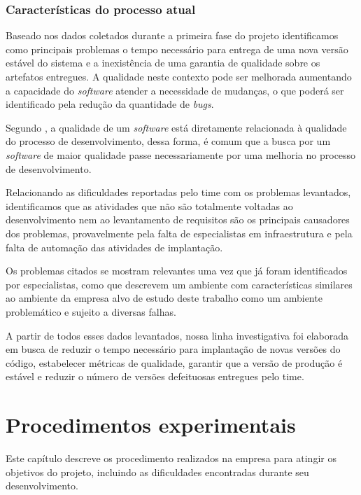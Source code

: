 \documentclass[
12pt,				%
openright,			%
oneside,			%
a4paper,			%
english,			%
french,				%
spanish,			%
brazil,				%
]{abntex2}
\begin{document}
\subsection{Características do processo atual} 

Baseado nos dados coletados durante a primeira fase do projeto identificamos como principais problemas o tempo necessário para entrega de uma nova versão estável do sistema e a inexistência de uma garantia de qualidade sobre os artefatos entregues. A qualidade neste contexto pode ser melhorada aumentando a capacidade do \textit{software} atender a necessidade de mudanças, o que poderá ser identificado pela redução da quantidade de \textit{bugs}.

Segundo , a qualidade de um \textit{software} está diretamente relacionada à qualidade do processo de desenvolvimento, dessa forma, é comum que a busca por um \textit{software} de maior qualidade passe necessariamente por uma melhoria no processo de desenvolvimento.

Relacionando as dificuldades reportadas pelo time com os problemas levantados, identificamos que as atividades que não são totalmente voltadas ao desenvolvimento nem ao levantamento de requisitos são os principais causadores dos problemas, provavelmente pela falta de especialistas em infraestrutura e pela falta de automação das atividades de implantação.

Os problemas citados se mostram relevantes uma vez que já foram identificados por especialistas, como  que descrevem um ambiente com características similares ao ambiente da empresa alvo de estudo deste trabalho como um ambiente problemático e sujeito a diversas falhas.

A partir de todos esses dados levantados, nossa linha investigativa foi elaborada em busca de reduzir o tempo necessário para implantação de novas versões do código, estabelecer métricas de qualidade, garantir que a versão de produção é estável e reduzir o número de versões defeituosas entregues pelo time.


\chapter{Procedimentos experimentais}

Este capítulo descreve os procedimento realizados na empresa para atingir os objetivos do projeto, incluindo as dificuldades encontradas durante seu desenvolvimento.
\end{document}
